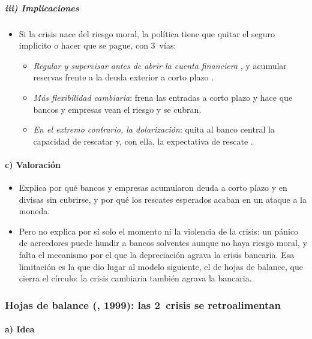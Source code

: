 \documentclass[11pt]{article}
\begin{document}
\subparagraph{iii) Implicaciones}

\begin{itemize}
\item Si la crisis nace del riesgo moral, la política tiene que quitar el seguro implícito o hacer que se pague, con 3~vías:
  \begin{itemize}
  \item \emph{Regular y supervisar antes de abrir la cuenta financiera} , y acumular reservas frente a la deuda exterior a corto plazo .
  \item \emph{Más flexibilidad cambiaria}: frena las entradas a corto plazo y hace que bancos y empresas vean el riesgo y se cubran.
  \item \emph{En el extremo contrario, la dolarización}: quita al banco central la capacidad de rescatar y, con ella, la expectativa de rescate .
  \end{itemize}
\end{itemize}

\paragraph{c) Valoración}

\begin{itemize}
\item Explica por qué bancos y empresas acumularon deuda a corto plazo y en divisas sin cubrirse, y por qué los rescates esperados acaban en un ataque a la moneda.
\item Pero no explica por sí solo el momento ni la violencia de la crisis: un pánico de acreedores puede hundir a bancos solventes aunque no haya riesgo moral, y falta el mecanismo por el que la depreciación agrava la crisis bancaria. Esa limitación es la que dio lugar al modelo siguiente, el de hojas de balance, que cierra el círculo: la crisis cambiaria también agrava la bancaria.
\end{itemize}

\subsubsection{Hojas de balance (, 1999): las 2~crisis se retroalimentan}\label{sec:hojas-balance}

\paragraph{a) Idea}
\end{document}
